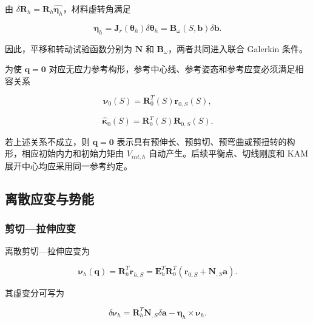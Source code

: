 由 \(\delta\mathbf{R}_{h} = \mathbf{R}_{h}\widehat{\bm{\eta}_{h}}\)，材料虚转角满足

\begin{equation}
\label{eq:galerkin-2-14}
\bm{\eta}_{h} = \mathbf{J}_{r}\left( \bm{\theta}_{h} \right)\delta\bm{\theta}_{h} = \mathbf{B}_{\omega}\left( S,\mathbf{b} \right)\delta\mathbf{b}.
\end{equation}

因此，平移和转动试验函数分别为 \(\mathbf{N}\) 和 \(\mathbf{B}_{\omega}\)，两者共同进入联合 Galerkin 条件。

为使 \(\mathbf{q} = \mathbf{0}\) 对应无应力参考构形，参考中心线、参考姿态和参考应变必须满足相容关系

\begin{equation}
\label{eq:galerkin-2-15}
\bm{\nu}_{0}(S) = \mathbf{R}_{0}^{T}(S)\mathbf{r}_{0,S}(S),
\end{equation}

\begin{equation}
\label{eq:galerkin-2-16}
{\widehat{\bm{\kappa}}}_{0}(S) = \mathbf{R}_{0}^{T}(S)\mathbf{R}_{0,S}(S).
\end{equation}

若上述关系不成立，则 \(\mathbf{q} = \mathbf{0}\) 表示具有预伸长、预剪切、预弯曲或预扭转的构形，相应初始内力和初始力矩由 \(V_{int,h}\) 自动产生。后续平衡点、切线刚度和 KAM 展开中心均应采用同一参考约定。

\subsection{离散应变与势能}\label{sec:galerkin-2-3}

\subsubsection{剪切---拉伸应变}\label{sec:galerkin-2-3-1}

离散剪切---拉伸应变为

\begin{equation}
\label{eq:galerkin-2-17}
\bm{\nu}_{h}\left( \mathbf{q} \right) = \mathbf{R}_{h}^{T}\mathbf{r}_{h,S} = \mathbf{E}_{h}^{T}\mathbf{R}_{0}^{T}\left( \mathbf{r}_{0,S} + \mathbf{N}_{,S}\mathbf{a} \right).
\end{equation}

其虚变分可写为

\begin{equation}
\label{eq:galerkin-2-18}
\delta\bm{\nu}_{h} = \mathbf{R}_{h}^{T}\mathbf{N}_{,S}\delta\mathbf{a} - \bm{\eta}_{h} \times \bm{\nu}_{h}.
\end{equation}

